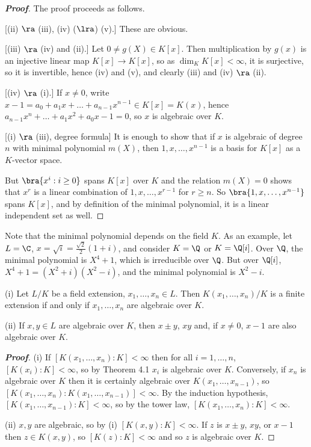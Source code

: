 \begin{proof}[\bf Proof]
The proof proceeds as follows.

[(ii) $\ra$ (iii), (iv) ($\lra$) (v).] These are obvious.

[(iii) $\ra$ (iv) and (ii).] Let $0 \neq  g(X) \in K[x]$. Then multiplication by $g(x)$ is an injective linear map $K[x] \to K[x]$, so as $\dim_K K[x] < \infty$, it is surjective, so it is invertible, hence (iv) and (v), and clearly (iii) and (iv) $\ra$ (ii).

[(iv) $\ra$ (i).] If $x \neq 0$, write $x-1 = a_0 + a_1x + \dots+ a_{n-1}x^{n-1} \in K[x] = K(x)$, hence $a_{n-1}x^n + \dots+ a_1x^2 + a_0x - 1 = 0$, so $x$ is algebraic over $K$.

[(i) $\ra$ (iii), degree formula] It is enough to show that if $x$ is algebraic of degree $n$ with minimal polynomial $m(X)$, then $1, x, \dots , x^{n-1}$ is a basis for $K[x]$ as a $K$-vector space.

But $\bra{x^i : i \geq  0}$ spans $K[x]$ over $K$ and the relation $m(X) = 0$ shows that $x^r$ is a linear combination of $1, x, \dots , x^{r-1}$ for $r \geq n$. So $\bra{1, x, \dots , x^{n-1}}$ spans $K[x]$, and by definition of the minimal polynomial, it is a linear independent set as well.
\end{proof}

\begin{example}
Note that the minimal polynomial depends on the field $K$. As an example, let $L = \C$, $x = \sqrt{i} = \frac{\sqrt{2}}2 (1 + i)$, and consider $K = \Q$ or $K = \Q[i]$. Over $\Q$, the minimal polynomial is $X^4+1$, which is irreducible over $\Q$. But over $\Q[i]$, $X^4+1 = (X^2+i)(X^2-i)$, and the minimal polynomial is $X^2 - i$.
\end{example}

\begin{corollary}
\ben
\item [(i)] Let $L/K$ be a field extension, $x_1, \dots , x_n \in L$. Then $K(x_1, \dots , x_n)/K$ is a finite extension if and only if $x_1, \dots , x_n$ are algebraic over $K$.
\item [(ii)] If $x, y \in L$ are algebraic over $K$, then $x\pm y$, $xy$ and, if $x \neq  0$, $x-1$ are also algebraic over $K$.
\een
\end{corollary}

\begin{proof}[\bf Proof]
\ben
\item [(i)] If $[K(x_1, \dots , x_n) : K] < \infty$ then for all $i = 1, \dots , n$, $[K(x_i) : K] < \infty$, so by Theorem 4.1 $x_i$ is algebraic over $K$. Conversely, if $x_n$ is algebraic over $K$ then it is certainly algebraic over $K(x_1, \dots , x_{n-1})$, so $[K(x_1, \dots , x_n) : K(x_1, \dots , x_{n-1})] < \infty$. By the induction hypothesis, $[K(x_1, \dots , x_{n-1}) : K] < \infty$, so by the tower law, $[K(x_1, \dots , x_n) : K] < \infty$.

\item [(ii)] $x, y$ are algebraic, so by (i) $[K(x, y) : K] < \infty$. If $z$ is $x \pm y$, $xy$, or $x-1$ then $z \in K(x, y)$, so $[K(z) : K] < \infty$ and so $z$ is algebraic over $K$.
\een
\end{proof}

